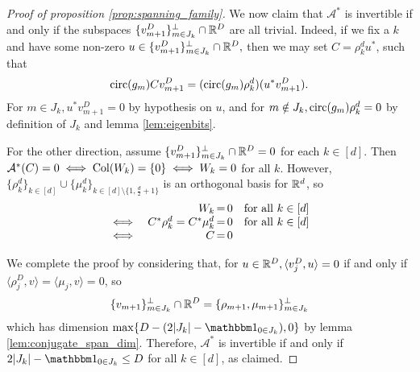 \begin{proof}[Proof of proposition \ref{prop:spanning_family}]
  We now claim that $\mathcal{A}^*$ is invertible if and only if the subspaces $\{v_{m + 1}^D\}_{m \in J_k}^\perp \cap \mathbb{R}^D$ are all trivial.  Indeed, if we fix a $k$ and have some non-zero $u \in \{v_{m + 1}^D\}_{m \in J_k}^\perp \cap \mathbb{R}^D,$ then we may set $C = \rho_k^d u^*$, such that \[\operatorname{circ}(g_m) C v_{m + 1}^D = (\operatorname{circ}(g_m) \rho_k^d) (u^* v_{m + 1}^D).\]  For $m \in J_k, u^* v_{m + 1}^D = 0$ by hypothesis on $u$, and for $m \notin J_k, \operatorname{circ}(g_m) \rho_k^d = 0$ by definition of $J_k$ and lemma \ref{lem:eigenbits}.

  For the other direction, assume $\{v_{m + 1}^D\}_{m \in J_k}^\perp \cap \mathbb{R}^D = 0$ for each $k \in [d]$.  Then $\mathcal{A}^*(C) = 0 \iff \operatorname{Col}(W_k) = \{0\} \iff W_k = 0$ for all $k$.  However, $\{\rho_k^d\}_{k \in [d]} \cup \{\mu_k^d\}_{k \in [d] \setminus \{1, \frac{d}{2} + 1\}}$ is an orthogonal basis for $\mathbb{R}^d$, so \[\begin{array}{cr@{\,=\,}lr} & W_k & 0 & \text{for all} \ k \in [d] \\ \iff & C^* \rho_k^d = C^* \mu_k^d & 0 & \text{for all} \ k \in [d] \\ \iff & C & 0 & \end{array}\]


  We complete the proof by considering that, for $u \in \mathbb{R}^{D}, \langle v_j^D, u \rangle = 0$ if and only if $\langle \rho_j^D, v \rangle = \langle \mu_j, v \rangle = 0$, so \[\{v_{m + 1}\}_{m \in J_k}^\perp \cap \mathbb{R}^{D} = \{\rho_{m + 1}, \mu_{m + 1}\}_{m \in J_k}^\perp\] which has dimension $\max\{D - (2|J_k| - \one_{0 \in J_k}), 0\}$ by lemma \ref{lem:conjugate_span_dim}.  Therefore, $\mathcal{A}^*$ is invertible if and only if $2|J_k| - \one_{0 \in J_k} \le D$ for all $k \in [d]$, as claimed.
\end{proof}

